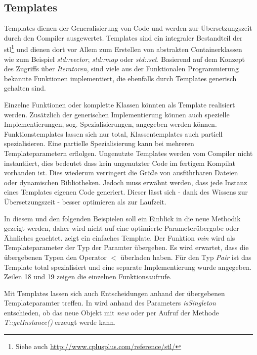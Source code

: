 \subsection{Templates}
Templates dienen der Generalisierung von Code und werden zur Übersetzungszeit durch den Compiler ausgewertet. Templates sind ein integraler Bestandteil der \ac{stl}\footnote{Siehe auch \url{http://www.cplusplus.com/reference/stl/}} und dienen dort vor Allem zum Erstellen von abstrakten Containerklassen wie zum Beispiel \emph{std::vector}, \emph{std::map} oder \emph{std::set}. Basierend auf dem Konzept des Zugriffs über \emph{Iteratoren}, sind viele aus der Funktionalen Programmierung bekannte Funktionen implementiert, die ebenfalls durch Templates generisch gehalten sind.

Einzelne Funktionen oder komplette Klassen könnten als Template realisiert werden. Zusätzlich der generischen Implementierung können auch spezielle Implementierungen, sog. Spezialisierungen, angegeben werden können. Funktionstemplates lassen sich nur total, Klassentemplates auch partiell spezialisieren. Eine partielle Spezialisierung kann bei mehreren Templateparametern erflolgen. Ungenutzte Templates werden vom Compiler nicht instantiiert, dies bedeutet dass kein ungenutzter Code im fertigem Kompilat vorhanden ist. Dies wiederum verringert die Größe von ausführbaren Dateien oder dynamischen Bibliotheken. Jedoch muss erwähnt werden, dass jede Instanz eines Templates eigenen Code generiert. Dieser lässt sich - dank des Wissens zur Übersetzungszeit - besser optimieren als zur Laufzeit.

In diesem und den folgenden Beispielen soll ein Einblick in die neue Methodik gezeigt werden, daher wird nicht auf eine optimierte Parameterübergabe oder Ähnliches geachtet.  zeigt ein einfaches Template. Der Funktion \emph{min} wird als Templateparameter der Typ der Paramter übergeben. Es wird erwartet, dass die übergebenen Typen den Operator $<$ überladen haben. Für den Typ \emph{Pair} ist das Template total spezialisiert und eine separate Implementierung wurde angegeben. Zeilen 18 und 19 zeigen die einzelnen Funktionsaufrufe.



Mit Templates lassen sich auch Entscheidungen anhand der übergebenen Templateparamter treffen. In  wird anhand des Parameters \emph{isSingleton} entschieden, ob das neue Objekt mit \emph{new} oder per Aufruf der Methode \emph{T::getInstance()} erzeugt werde kann.

